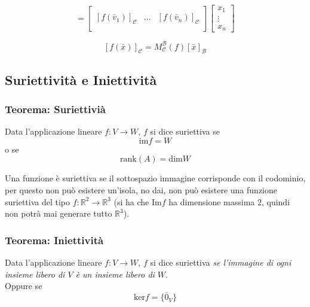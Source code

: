 \documentclass[x11names]{article}
\begin{document}
\[
= \left[\begin{array}{c|c|c}
	& & \\
	\left[f(\bar{v}_{1})\right]_{\mathcal{C}} & \dots & \left[f(\bar{v}_{n})\right]_{\mathcal{C}}\\
	& &
\end{array}\right]\left[\begin{array}{c}
x_{1} \\ \vdots \\ x_{n}
\end{array}\right]
\]

\[
\left[f(\bar{x})\right]_{\mathcal{C}} = M^\mathcal{B}_{\mathcal{C}}(f)\left[\bar{x}\right]_{\mathcal{B}}
\]


\subsection{Suriettività e Iniettività}
\begin{center}
	\colorbox{myred}{\begin{minipage}{5.75in}
			\begin{redes}{}
	\subsubsection{Teorema: Suriettivià}
Data l'applicazione lineare $f: V \to W$, $f$ si dice suriettiva se 
\[
\text{im}f = W
\]
o se 
\[
\text{rank}(A) = \text{dim}W
\]
	\end{redes}
	\end{minipage}}        
\end{center}
			

\noindent
Una funzione è suriettiva se il sottospazio immagine corrisponde con il codominio, per questo non può esistere un'isola, no dai, non può esistere una funzione suriettiva del tipo $f:\mathbb{R}^2 \to \mathbb{R}^3$ (si ha che $\text{Im}f$ ha dimensione massima 2, quindi non potrà mai generare tutto $\mathbb{R}^3$).


\begin{center}
	\colorbox{myred}{\begin{minipage}{5.75in}
			\begin{redes}{}
			\subsubsection{Teorema: Iniettività}
			Data l'applicazione lineare $f: V \to W$, $f$ si dice suriettiva \textit{se l'immagine di ogni insieme libero di $V$ è un insieme libero di $W$}. \\
			
			Oppure se 
			\[
			\text{ker}f = \{\bar{0}_{V}\}
			\]
				
				
			\end{redes}
	\end{minipage}}        
\end{center}
				
\end{document}
